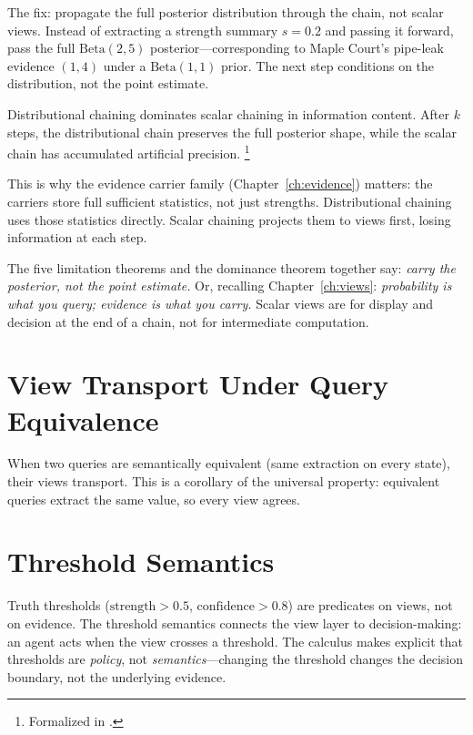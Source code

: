 \documentclass[11pt,openany]{report}
\begin{document}
The fix: propagate the full posterior distribution through the chain,
not scalar views.  Instead of extracting a strength summary $s = 0.2$
and passing it forward, pass the full $\text{Beta}(2, 5)$
posterior---corresponding to Maple Court's pipe-leak evidence $(1, 4)$
under a $\text{Beta}(1, 1)$ prior.  The next step conditions on the
distribution, not the point estimate.

\begin{theorem}
Distributional chaining dominates scalar chaining in information
content.  After $k$ steps, the distributional chain preserves the
full posterior shape, while the scalar chain has accumulated artificial
precision.%
\footnote{Formalized in
.}
\end{theorem}

\noindent
This is why the evidence carrier family (Chapter~\ref{ch:evidence})
matters: the carriers store full sufficient statistics, not just
strengths.  Distributional chaining uses those statistics directly.
Scalar chaining projects them to views first, losing information at
each step.

The five limitation theorems and the dominance theorem together say:
\emph{carry the posterior, not the point estimate.}  Or, recalling
Chapter~\ref{ch:views}: \emph{probability is what you query;
evidence is what you carry.}  Scalar views are for display and
decision at the end of a chain, not for intermediate computation.

\section{View Transport Under Query Equivalence}

When two queries are semantically equivalent (same extraction on
every state), their views transport.  This is a corollary of the
universal property: equivalent queries extract the same value, so
every view agrees.

\section{Threshold Semantics}

Truth thresholds ($\mathrm{strength} > 0.5$,
$\mathrm{confidence} > 0.8$) are predicates on views, not on
evidence.  The threshold semantics connects the view layer to
decision-making: an agent acts when the view crosses a threshold.
The calculus makes explicit that thresholds are \emph{policy}, not
\emph{semantics}---changing the threshold changes the decision
boundary, not the underlying evidence.
\end{document}
